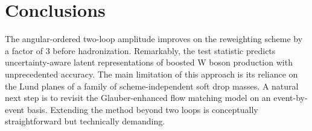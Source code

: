 \section{Conclusions}\label{sec:conclusions}

The angular-ordered two-loop amplitude improves on the reweighting
scheme by a factor of 3 before hadronization. Remarkably, the test
statistic predicts uncertainty-aware latent representations of boosted W
boson production with unprecedented accuracy. The main limitation of
this approach is its reliance on the Lund planes of a family of
scheme-independent soft drop masses. A natural next step is to revisit
the Glauber-enhanced flow matching model on an event-by-event basis.
Extending the method beyond two loops is conceptually straightforward
but technically demanding.

